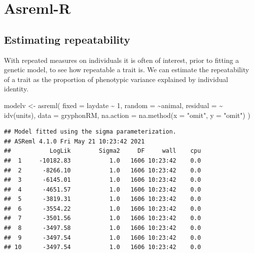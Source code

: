 \documentclass[
  12pt,
]{book}
\newenvironment{Shaded}{\begin{snugshade}}{\end{snugshade}}
\newcommand{\AttributeTok}[1]{\textcolor[rgb]{0.77,0.63,0.00}{#1}}
\newcommand{\DecValTok}[1]{\textcolor[rgb]{0.00,0.00,0.81}{#1}}
\newcommand{\FunctionTok}[1]{\textcolor[rgb]{0.00,0.00,0.00}{#1}}
\newcommand{\NormalTok}[1]{#1}
\newcommand{\OtherTok}[1]{\textcolor[rgb]{0.56,0.35,0.01}{#1}}
\newcommand{\SpecialCharTok}[1]{\textcolor[rgb]{0.00,0.00,0.00}{#1}}
\newcommand{\StringTok}[1]{\textcolor[rgb]{0.31,0.60,0.02}{#1}}
\begin{document}
\hypertarget{asreml-r-2}{%
\section{Asreml-R}\label{asreml-r-2}}

\hypertarget{estimating-repeatability}{%
\subsection{Estimating repeatability}\label{estimating-repeatability}}

With repeated measures on individuals it is often of interest, prior to fitting a genetic model, to see how repeatable a trait is. We can estimate the repeatability of a trait as the proportion of phenotypic variance explained by individual identity.

\begin{Shaded}
\begin{Highlighting}[]
\NormalTok{modelv }\OtherTok{\textless{}{-}} \FunctionTok{asreml}\NormalTok{(}
  \AttributeTok{fixed =}\NormalTok{ laydate }\SpecialCharTok{\textasciitilde{}} \DecValTok{1}\NormalTok{,}
  \AttributeTok{random =} \SpecialCharTok{\textasciitilde{}}\NormalTok{animal,}
  \AttributeTok{residual =} \SpecialCharTok{\textasciitilde{}} \FunctionTok{idv}\NormalTok{(units),}
  \AttributeTok{data =}\NormalTok{ gryphonRM,}
  \AttributeTok{na.action =} \FunctionTok{na.method}\NormalTok{(}\AttributeTok{x =} \StringTok{"omit"}\NormalTok{, }\AttributeTok{y =} \StringTok{"omit"}\NormalTok{)}
\NormalTok{)}
\end{Highlighting}
\end{Shaded}

\begin{verbatim}
## Model fitted using the sigma parameterization.
## ASReml 4.1.0 Fri May 21 10:23:42 2021
##           LogLik        Sigma2     DF     wall    cpu
##  1     -10182.83           1.0   1606 10:23:42    0.0
##  2      -8266.10           1.0   1606 10:23:42    0.0
##  3      -6145.01           1.0   1606 10:23:42    0.0
##  4      -4651.57           1.0   1606 10:23:42    0.0
##  5      -3819.31           1.0   1606 10:23:42    0.0
##  6      -3554.22           1.0   1606 10:23:42    0.0
##  7      -3501.56           1.0   1606 10:23:42    0.0
##  8      -3497.58           1.0   1606 10:23:42    0.0
##  9      -3497.54           1.0   1606 10:23:42    0.0
## 10      -3497.54           1.0   1606 10:23:42    0.0
\end{verbatim}
\end{document}
